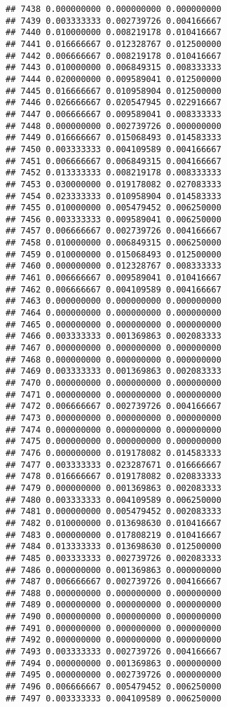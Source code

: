 \documentclass[
]{article}
\begin{document}
\begin{verbatim}
## 7438 0.000000000 0.000000000 0.000000000
## 7439 0.003333333 0.002739726 0.004166667
## 7440 0.010000000 0.008219178 0.010416667
## 7441 0.016666667 0.012328767 0.012500000
## 7442 0.006666667 0.008219178 0.010416667
## 7443 0.010000000 0.006849315 0.008333333
## 7444 0.020000000 0.009589041 0.012500000
## 7445 0.016666667 0.010958904 0.012500000
## 7446 0.026666667 0.020547945 0.022916667
## 7447 0.006666667 0.009589041 0.008333333
## 7448 0.000000000 0.002739726 0.000000000
## 7449 0.016666667 0.015068493 0.014583333
## 7450 0.003333333 0.004109589 0.004166667
## 7451 0.006666667 0.006849315 0.004166667
## 7452 0.013333333 0.008219178 0.008333333
## 7453 0.030000000 0.019178082 0.027083333
## 7454 0.023333333 0.010958904 0.014583333
## 7455 0.010000000 0.005479452 0.006250000
## 7456 0.003333333 0.009589041 0.006250000
## 7457 0.006666667 0.002739726 0.004166667
## 7458 0.010000000 0.006849315 0.006250000
## 7459 0.010000000 0.015068493 0.012500000
## 7460 0.000000000 0.012328767 0.008333333
## 7461 0.006666667 0.009589041 0.010416667
## 7462 0.006666667 0.004109589 0.004166667
## 7463 0.000000000 0.000000000 0.000000000
## 7464 0.000000000 0.000000000 0.000000000
## 7465 0.000000000 0.000000000 0.000000000
## 7466 0.003333333 0.001369863 0.002083333
## 7467 0.000000000 0.000000000 0.000000000
## 7468 0.000000000 0.000000000 0.000000000
## 7469 0.003333333 0.001369863 0.002083333
## 7470 0.000000000 0.000000000 0.000000000
## 7471 0.000000000 0.000000000 0.000000000
## 7472 0.006666667 0.002739726 0.004166667
## 7473 0.000000000 0.000000000 0.000000000
## 7474 0.000000000 0.000000000 0.000000000
## 7475 0.000000000 0.000000000 0.000000000
## 7476 0.000000000 0.019178082 0.014583333
## 7477 0.003333333 0.023287671 0.016666667
## 7478 0.016666667 0.019178082 0.020833333
## 7479 0.000000000 0.001369863 0.002083333
## 7480 0.003333333 0.004109589 0.006250000
## 7481 0.000000000 0.005479452 0.002083333
## 7482 0.010000000 0.013698630 0.010416667
## 7483 0.000000000 0.017808219 0.010416667
## 7484 0.013333333 0.013698630 0.012500000
## 7485 0.003333333 0.002739726 0.002083333
## 7486 0.000000000 0.001369863 0.000000000
## 7487 0.006666667 0.002739726 0.004166667
## 7488 0.000000000 0.000000000 0.000000000
## 7489 0.000000000 0.000000000 0.000000000
## 7490 0.000000000 0.000000000 0.000000000
## 7491 0.000000000 0.000000000 0.000000000
## 7492 0.000000000 0.000000000 0.000000000
## 7493 0.003333333 0.002739726 0.004166667
## 7494 0.000000000 0.001369863 0.000000000
## 7495 0.000000000 0.002739726 0.000000000
## 7496 0.006666667 0.005479452 0.006250000
## 7497 0.003333333 0.004109589 0.006250000

\end{verbatim}
\end{document}
